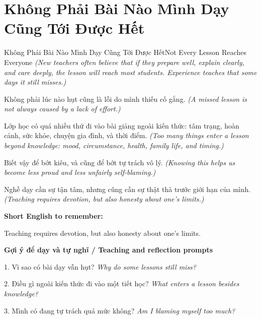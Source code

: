 \section{Không Phải Bài Nào Mình Dạy Cũng Tới Được Hết}
\begin{truyen}{Không Phải Bài Nào Mình Dạy Cũng Tới Được Hết}{Not Every Lesson Reaches Everyone}
\textit{(New teachers often believe that if they prepare well, explain clearly, and care deeply, the lesson will reach most students. Experience teaches that some days it still misses.)}

Không phải lúc nào hụt cũng là lỗi do mình thiếu cố gắng.
\textit{(A missed lesson is not always caused by a lack of effort.)}

Lớp học có quá nhiều thứ đi vào bài giảng ngoài kiến thức: tâm trạng, hoàn cảnh, sức khỏe, chuyện gia đình, và thời điểm.
\textit{(Too many things enter a lesson beyond knowledge: mood, circumstance, health, family life, and timing.)}

Biết vậy để bớt kiêu, và cũng để bớt tự trách vô lý.
\textit{(Knowing this helps us become less proud and less unfairly self-blaming.)}

\end{truyen}

\begin{baihoc}
Nghề dạy cần sự tận tâm, nhưng cũng cần sự thật thà trước giới hạn của mình.
\textit{(Teaching requires devotion, but also honesty about one’s limits.)}
\end{baihoc}

\begin{ghinhoanh}
\textbf{Short English to remember:}

Teaching requires devotion, but also honesty about one’s limits.

\end{ghinhoanh}

\begin{tuhocnhanh}
\textbf{Gợi ý để dạy và tự nghĩ / Teaching and reflection prompts}

1. Vì sao có bài dạy vẫn hụt? \textit{Why do some lessons still miss?}

2. Điều gì ngoài kiến thức đi vào một tiết học? \textit{What enters a lesson besides knowledge?}

3. Mình có đang tự trách quá mức không? \textit{Am I blaming myself too much?}
\end{tuhocnhanh}
\ngancach

